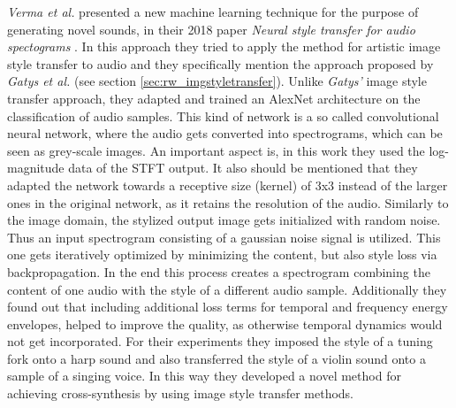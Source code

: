 \textit{Verma et al.} presented a new machine learning technique for the purpose of generating novel sounds, in their 2018 paper \textit{Neural style transfer for audio spectograms} \cite{verma2018neural}. In this approach they tried to apply the method for artistic image style transfer to audio and they specifically mention the approach proposed by \textit{Gatys et al.} \cite{Gatys2016} (see section \ref{sec:rw_imgstyletransfer}). Unlike \textit{Gatys'} image style transfer approach, they adapted and trained an AlexNet architecture on the classification of audio samples. This kind of network is a so called convolutional neural network, where the audio gets converted into spectrograms, which can be seen as grey-scale images. An important aspect is, in this work they used the log-magnitude data of the STFT output. It also should be mentioned that they adapted the network towards a receptive size (kernel) of 3x3 instead of the larger ones in the original network, as it retains the resolution of the audio. Similarly to the image domain, the stylized output image gets initialized with random noise. Thus an input spectrogram consisting of a gaussian noise signal is utilized. This one gets iteratively optimized by minimizing the content, but also style loss via backpropagation. In the end this process creates a spectrogram combining the content of one audio with the style of a different audio sample. Additionally they found out that including additional loss terms for temporal and frequency energy envelopes, helped to improve the quality, as otherwise temporal dynamics would not get incorporated. For their experiments they imposed the style of a tuning fork onto a harp sound and also transferred the style of a violin sound onto a sample of a singing voice. In this way they developed a novel method for achieving cross-synthesis by using image style transfer methods.

